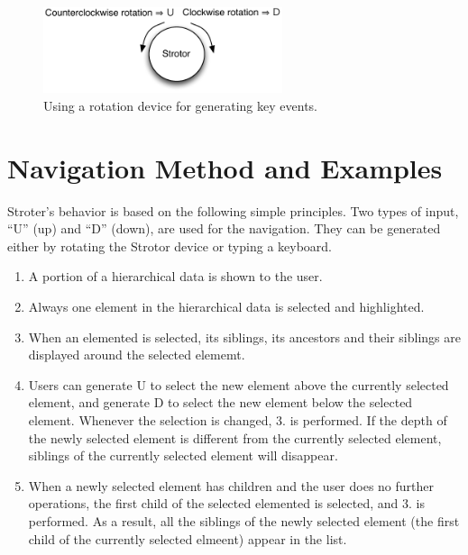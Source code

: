 \documentclass{article}
\begin{document}

\begin{figure}[H]
\centerline{\includegraphics[width=70mm,bb=0 0 306 110]{figures/rotation.pdf}}
\caption{Using a rotation device for generating key events.}
\label{rotation}
\end{figure}

\section*{Navigation Method and Examples}

Stroter's behavior is based on the following simple principles.
Two types of input, ``U'' (up) and ``D'' (down), are used for the navigation.
They can be generated either by rotating the Strotor device or typing a keyboard.

\begin{enumerate}
\item A portion of a hierarchical data is shown to the user.

\item Always one element in the hierarchical data is selected and highlighted.


\item When an elemented is selected, its siblings, its ancestors and their siblings are displayed
around the selected elememt.

\item Users can generate U to select the new element above the currently selected element,
and generate D to select the new element below the selected element.
Whenever the selection is changed, 3. is performed.
If the depth of the newly selected element is different from the currently
selected element, siblings of the currently selected element will disappear.

\item When a newly selected element has children and the user does no further operations,
the first child of the selected elemented is selected, and 3. is performed.
As a result, all the siblings of the newly selected element
(the first child of the currently selected elmeent) appear in the list.

\end{enumerate}
\end{document}
